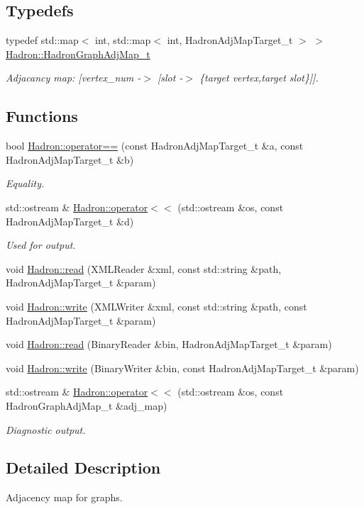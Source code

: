 \subsection*{Typedefs}
\begin{DoxyCompactItemize}
\item 
typedef std\+::map$<$ int, std\+::map$<$ int, Hadron\+Adj\+Map\+Target\+\_\+t $>$ $>$ \mbox{\hyperlink{namespaceHadron_ad6387ffed6a1bf53021dce29b71d3a04}{Hadron\+::\+Hadron\+Graph\+Adj\+Map\+\_\+t}}
\begin{DoxyCompactList}\small\item\em Adjacancy map\+: \mbox{[}vertex\+\_\+num -\/$>$ \mbox{[}slot -\/$>$ \{target vertex,target slot\}\mbox{]}\mbox{]}. \end{DoxyCompactList}\end{DoxyCompactItemize}
\subsection*{Functions}
\begin{DoxyCompactItemize}
\item 
bool \mbox{\hyperlink{namespaceHadron_a89bb389d765cff67405fdb2d27b9b289}{Hadron\+::operator==}} (const Hadron\+Adj\+Map\+Target\+\_\+t \&a, const Hadron\+Adj\+Map\+Target\+\_\+t \&b)
\begin{DoxyCompactList}\small\item\em Equality. \end{DoxyCompactList}\item 
std\+::ostream \& \mbox{\hyperlink{namespaceHadron_ad9b3f6b8246d630d96e54032def25900}{Hadron\+::operator$<$$<$}} (std\+::ostream \&os, const Hadron\+Adj\+Map\+Target\+\_\+t \&d)
\begin{DoxyCompactList}\small\item\em Used for output. \end{DoxyCompactList}\item 
void \mbox{\hyperlink{namespaceHadron_a9a69bb90cd1c62da66808573864f7cd1}{Hadron\+::read}} (X\+M\+L\+Reader \&xml, const std\+::string \&path, Hadron\+Adj\+Map\+Target\+\_\+t \&param)
\item 
void \mbox{\hyperlink{namespaceHadron_add6d43a3a15c934d9c3e98989588d22e}{Hadron\+::write}} (X\+M\+L\+Writer \&xml, const std\+::string \&path, const Hadron\+Adj\+Map\+Target\+\_\+t \&param)
\item 
void \mbox{\hyperlink{namespaceHadron_a2e69cce268ca3e4d68bc0954eb3f8065}{Hadron\+::read}} (Binary\+Reader \&bin, Hadron\+Adj\+Map\+Target\+\_\+t \&param)
\item 
void \mbox{\hyperlink{namespaceHadron_a97d7de65e3fea244c875c2cb76decfda}{Hadron\+::write}} (Binary\+Writer \&bin, const Hadron\+Adj\+Map\+Target\+\_\+t \&param)
\item 
std\+::ostream \& \mbox{\hyperlink{namespaceHadron_aefc74b3ac5cc28e73ed7a9e24b032449}{Hadron\+::operator$<$$<$}} (std\+::ostream \&os, const Hadron\+Graph\+Adj\+Map\+\_\+t \&adj\+\_\+map)
\begin{DoxyCompactList}\small\item\em Diagnostic output. \end{DoxyCompactList}\end{DoxyCompactItemize}


\subsection{Detailed Description}
Adjacency map for graphs. 

